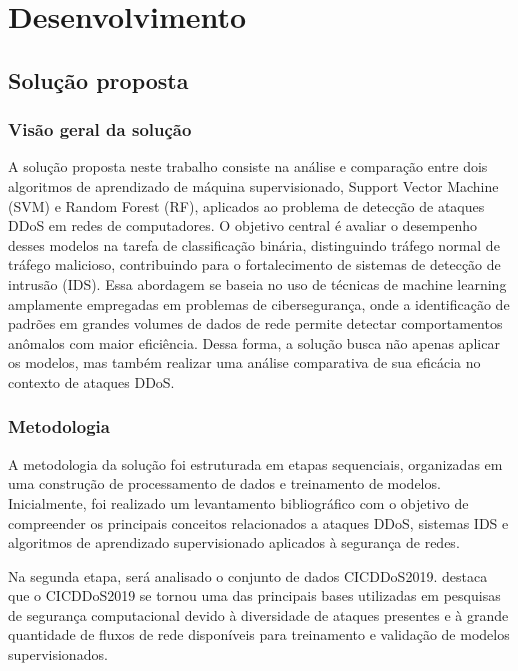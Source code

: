 \documentclass[
    12pt,                %
    openright,           %
    oneside,             %
    a4paper,             %
    english,             %
    brazil               %
]{abntex2}
\begin{document}
\chapter{Desenvolvimento}
\label{cap:desenvolvimento}

\section{Solução proposta}
\label{sec:solucao}

\subsection{Visão geral da solução} A solução proposta neste trabalho consiste na análise e comparação entre dois algoritmos de aprendizado de máquina supervisionado, Support Vector Machine (SVM) e Random Forest (RF), aplicados ao problema de detecção de ataques DDoS em redes de computadores. O objetivo central é avaliar o desempenho desses modelos na tarefa de classificação binária, distinguindo tráfego normal de tráfego malicioso, contribuindo para o fortalecimento de sistemas de detecção de intrusão (IDS). Essa abordagem se baseia no uso de técnicas de machine learning amplamente empregadas em problemas de cibersegurança, onde a identificação de padrões em grandes volumes de dados de rede permite detectar comportamentos anômalos com maior eficiência. Dessa forma, a solução busca não apenas aplicar os modelos, mas também realizar uma análise comparativa de sua eficácia no contexto de ataques DDoS.

\subsection{Metodologia} A metodologia da solução foi estruturada em etapas sequenciais, organizadas em uma construção de processamento de dados e treinamento de modelos. Inicialmente, foi realizado um levantamento bibliográfico com o objetivo de compreender os principais conceitos relacionados a ataques DDoS, sistemas IDS e algoritmos de aprendizado supervisionado aplicados à segurança de redes.

Na segunda etapa, será analisado o conjunto de dados CICDDoS2019.  destaca que o CICDDoS2019 se tornou uma das principais bases utilizadas em pesquisas de segurança computacional devido à diversidade de ataques presentes e à grande quantidade de fluxos de rede disponíveis para treinamento e validação de modelos supervisionados. 
\end{document}
